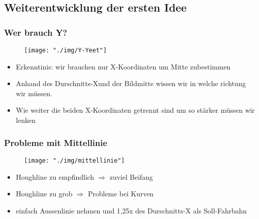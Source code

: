 \documentclass{beamer}
\begin{document}
\subsection{Weiterentwicklung der ersten Idee}

\begin{frame}

\frametitle{Wer brauch Y?}

\begin{center}
\begin{figure}[h]
\centering
\texttt{[image: "./img/Y-Yeet"]}

\label{fig:Weg mit dem Y}
\end{figure}
\end{center}

\begin{itemize}
\item Erkenntinis: wir brauchen nur X-Koordinaten um Mitte zubestimmen
\item Anhand des \glqq Durschnitts-X\grqq  und der Bildmitte wissen wir in welche richtung wir müssen. 
\item Wie weiter die beiden X-Koordinaten getrennt sind um so stärker müssen wir lenken 
\end{itemize}

\end{frame}

\begin{frame}

\frametitle{Probleme mit Mittellinie}

\begin{center}
\begin{figure}[h]
\centering
\texttt{[image: "./img/mittellinie"]}
\label{fig:Mittellinie}
\end{figure}
\end{center}

\begin{itemize}
\item Houghline zu empfindlich $\Rightarrow$ zuviel \glqq Beifang\grqq 
\item Houghline zu grob $\Rightarrow$ Probleme bei Kurven
\item einfach Aussenlinie nehmen und 1,25x des Durschnitts-X als Soll-Fahrbahn
\end{itemize}

\end{frame}
\end{document}
